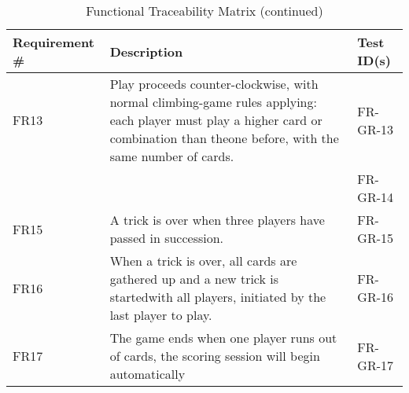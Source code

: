 \documentclass[12pt, titlepage]{article}
\begin{document}
\begin{table}[h!]
\centering
\caption{Functional Traceability Matrix (continued)}
\begin{tabular}{|p{2.5cm} p{10cm} p{2.5cm}|} 
 \hline
 Requirement \# & Description & Test ID(s) \\ 
 \hline
 FR13 & Play proceeds counter-clockwise, with normal climbing-game rules applying:  each player must play a higher card or combination than theone before, with the same number of cards. & FR-GR-13 \\ 
  &  & FR-GR-14 \\ 
 FR15 & A trick is over when three players have passed in succession. & FR-GR-15 \\ 
 FR16 & When a trick is over, all cards are gathered up and a new trick is startedwith all players, initiated by the last player to play. & FR-GR-16 \\ 
 FR17 & The game ends when one player runs out of cards, the scoring session will begin automatically & FR-GR-17 \\ 
 \hline
\end{tabular}
\end{table}

\newpage
\end{document}
